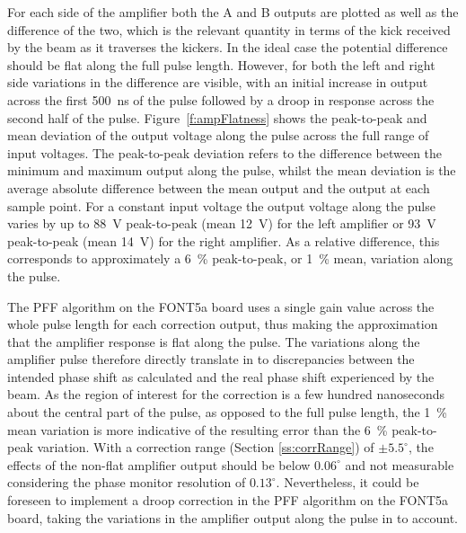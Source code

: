 For each side of the amplifier both the A and B outputs are plotted as well as the difference of the two, which is the relevant quantity in terms of the kick received by the beam as it traverses the kickers. In the ideal case the potential difference should be flat along the full pulse length. However, for both the left and right side variations in the difference are visible, with an initial increase in output across the first 500~ns of the pulse followed by a droop in response across the second half of the pulse. Figure~\ref{f:ampFlatness} shows the peak-to-peak and mean deviation of the output voltage along the pulse across the full range of input voltages. The peak-to-peak deviation refers to the difference between the minimum and maximum output along the pulse, whilst the mean deviation is the average absolute difference between the mean output and the output at each sample point. For a constant input voltage the output voltage along the pulse varies by up to 88~V peak-to-peak (mean 12~V) for the left amplifier or 93~V peak-to-peak (mean 14~V) for the right amplifier. As a relative difference, this corresponds to approximately a 6~\% peak-to-peak, or 1~\% mean, variation along the pulse.

The PFF algorithm on the FONT5a board uses a single gain value across the whole pulse length for each correction output, thus making the approximation that the amplifier response is flat along the pulse. The variations along the amplifier pulse therefore directly translate in to discrepancies between the intended phase shift as calculated and the real phase shift experienced by the beam. As the region of interest for the correction is a few hundred nanoseconds about the central part of the pulse, as opposed to the full pulse length, the 1~\% mean variation is more indicative of the resulting error than the 6~\% peak-to-peak variation. With a correction range (Section \ref{ss:corrRange}) of \(\pm5.5^\circ\), the effects of the non-flat amplifier output should be below \(0.06^\circ\) and not measurable considering the phase monitor resolution of \(0.13^\circ\). Nevertheless, it could be foreseen to implement a droop correction in the PFF algorithm on the FONT5a board, taking the variations in the amplifier output along the pulse in to account.


